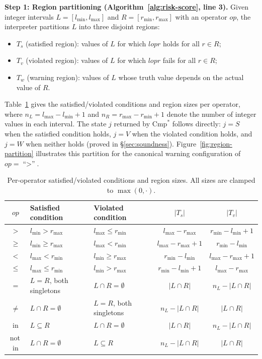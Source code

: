 \documentclass[pdflatex,sn-basic]{sn-jnl}%
\theoremstyle{thmstyleone}%
\theoremstyle{thmstyletwo}%
\theoremstyle{thmstylethree}%
\begin{document}
\smallskip
\noindent\textbf{Step 1: Region partitioning (Algorithm~\ref{alg:risk-score}, line 3).}
Given integer intervals $L = [l_{\min}, l_{\max}]$ and $R = [r_{\min}, r_{\max}]$ with an operator $op$, the interpreter partitions $L$ into three disjoint regions:
\begin{itemize}
    \item $T_s$ (satisfied region): values of $L$ for which $l \mathrel{op} r$ holds for all $r \in R$;
    \item $T_v$ (violated region): values of $L$ for which $l \mathrel{op} r$ fails for all $r \in R$;
    \item $T_w$ (warning region): values of $L$ whose truth value depends on the actual value of $R$.
\end{itemize}

Table~\ref{tab:op-formulas} gives the satisfied/violated conditions and region sizes per operator, where $n_L = l_{\max} - l_{\min} + 1$ and $n_R = r_{\max} - r_{\min} + 1$ denote the number of integer values in each interval.
The state $j$ returned by $\text{Cmp}^*$ follows directly: $j = S$ when the satisfied condition holds, $j = V$ when the violated condition holds, and $j = W$ when neither holds (proved in §\ref{sec:soundness}).
Figure~\ref{fig:region-partition} illustrates this partition for the canonical warning configuration of $op = \text{``$>$''}$.

\begin{table}[t]
\centering
\caption{Per-operator satisfied/violated conditions and region sizes. All sizes are clamped to $\max(0, \cdot)$.}
\label{tab:op-formulas}
\small
\begin{tabular}{cllcc}
\toprule
$op$ & Satisfied condition & Violated condition & $|T_s|$ & $|T_v|$ \\
\midrule
$>$    & $l_{\min} > r_{\max}$    & $l_{\max} \leq r_{\min}$  & $l_{\max} - r_{\max}$     & $r_{\min} - l_{\min} + 1$ \\
$\geq$ & $l_{\min} \geq r_{\max}$ & $l_{\max} < r_{\min}$     & $l_{\max} - r_{\max} + 1$ & $r_{\min} - l_{\min}$     \\
$<$    & $l_{\max} < r_{\min}$    & $l_{\min} \geq r_{\max}$  & $r_{\min} - l_{\min}$     & $l_{\max} - r_{\max} + 1$ \\
$\leq$ & $l_{\max} \leq r_{\min}$ & $l_{\min} > r_{\max}$     & $r_{\min} - l_{\min} + 1$ & $l_{\max} - r_{\max}$     \\
\midrule
$=$    & $L = R$, both singletons  & $L \cap R = \emptyset$  & $|L \cap R|$ & $n_L - |L \cap R|$ \\
$\neq$ & $L \cap R = \emptyset$  & $L = R$, both singletons  & $n_L - |L \cap R|$ & $|L \cap R|$ \\
\midrule
in     & $L \subseteq R$ & $L \cap R = \emptyset$ & $|L \cap R|$       & $n_L - |L \cap R|$ \\
not\,in & $L \cap R = \emptyset$ & $L \subseteq R$ & $n_L - |L \cap R|$ & $|L \cap R|$       \\
\bottomrule
\end{tabular}
\end{table}
\end{document}
